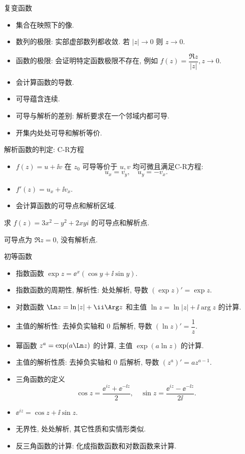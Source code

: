 \documentclass[aspectratio=169,handout]{ctexbeamer}
\begin{document}
\begin{frame}{复变函数}
	\begin{itemize}
		\item 集合在映照下的像.
		\item 数列的极限: 实部虚部数列都收敛. 若 $|z|\to0$ 则 $z\to0$.
		\item 函数的极限: 会证明特定函数极限不存在, 例如 $f(z)=\dfrac{\Re z}{|z|}, z\to 0$.
		\item 会计算函数的导数.
		\item 可导蕴含连续.
		\item 可导与解析的差别: 解析要求在一个邻域内都可导.
		\item 开集内处处可导和解析等价.
	\end{itemize}
\end{frame}


\begin{frame}{解析函数的判定: C-R方程}
	\begin{itemize}
		\item $f(z)=u+\ii v$ 在 $z_0$ 可导等价于 $u,v$ 均可微且满足C-R方程:
	\[
		u_x=v_y,\quad u_y=-v_x.
	\]
		\item $f'(z)=u_x+\ii v_x$.
		\item 会计算函数的可导点和解析区域.
	\end{itemize}
	\onslide<+->
	\begin{exercise}
		求 $f(z)=3x^2-y^2+2xyi$ 的可导点和解析点.
	\end{exercise}
	\onslide<+->
	\begin{answer}
		可导点为 $\Re z=0$, 没有解析点.
	\end{answer}
\end{frame}


\begin{frame}{初等函数}
	\begin{itemize}
		\item 指数函数 $\exp z=\ee^x(\cos y+\ii\sin y)$.
		\item 指数函数的周期性, 解析性: 处处解析, 导数 $(\exp z)'=\exp z$.
		\item 对数函数 $\Ln z=\ln|z|+\ii\Arg z$ 和主值 $\ln z=\ln|z|+\ii\arg z$ 的计算.
		\item 主值的解析性: 去掉负实轴和 $0$ 后解析, 导数 $(\ln z)'=\dfrac1z$.
		\item 幂函数 $z^a=\exp(a\Ln z)$ 的计算, 主值 $\exp(a\ln z)$ 的计算.
		\item 主值的解析性质: 去掉负实轴和 $0$ 后解析, 导数 $(z^a)'=az^{a-1}$.
		\item 三角函数的定义
	\[
			\cos z=\frac{\ee^{iz}+\ee^{-\ii z}}2,\quad
			\sin z=\frac{\ee^{iz}-\ee^{-\ii z}}{2\ii}.
	\]
		\item $\ee^{iz}=\cos z+\ii\sin z$.
		\item 无界性, 处处解析, 其它性质和实情形类似.
		\item 反三角函数的计算: 化成指数函数和对数函数来计算.
	\end{itemize}
\end{frame}
\end{document}
